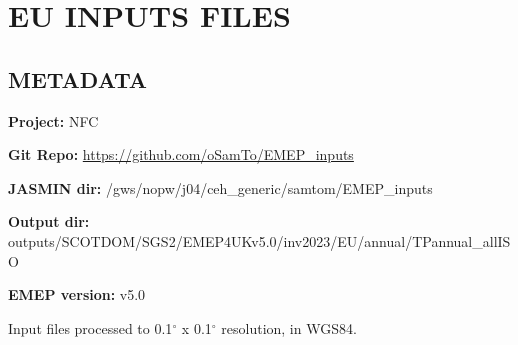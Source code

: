 \documentclass[
]{article}
\begin{document}
\newpage

\section{EU INPUTS FILES}\label{eu-inputs-files}

\subsection{METADATA}\label{metadata-1}

\textbf{Project:} NFC

\textbf{Git Repo:} \url{https://github.com/oSamTo/EMEP_inputs}

\textbf{JASMIN dir:} /gws/nopw/j04/ceh\_generic/samtom/EMEP\_inputs

\textbf{Output dir:}
outputs/SCOTDOM/SGS2/EMEP4UKv5.0/inv2023/EU/annual/TPannual\_allISO

\textbf{EMEP version:} v5.0

\vspace{\baselineskip}

Input files processed to 0.1\(^\circ\) x 0.1\(^\circ\) resolution, in
WGS84.

\vspace{\baselineskip}
\end{document}

